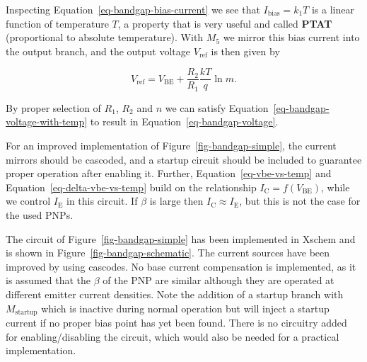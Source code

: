 \documentclass[
  a4paper,
  DIV=11,
  numbers=noendperiod]{scrartcl}
\begin{document}
Inspecting Equation~\ref{eq-bandgap-bias-current} we see that
\(I_\mathrm{bias} = k_1 T\) is a linear function of temperature \(T\), a
property that is very useful and called \textbf{PTAT} (proportional to
absolute temperature). With \(M_5\) we mirror this bias current into the
output branch, and the output voltage \(V_\mathrm{ref}\) is then given
by

\[
V_\mathrm{ref} = V_\mathrm{BE}+ \frac{R_2}{R_1} \frac{k T}{q} \ln m.  
\]

By proper selection of \(R_1\), \(R_2\) and \(n\) we can satisfy
Equation~\ref{eq-bandgap-voltage-with-temp} to result in
Equation~\ref{eq-bandgap-voltage}.

\begin{tcolorbox}[enhanced jigsaw, opacityback=0, title=\textcolor{quarto-callout-note-color}{\faInfo}\hspace{0.5em}{Improved Bandgap Reference}, leftrule=.75mm, bottomtitle=1mm, breakable, bottomrule=.15mm, opacitybacktitle=0.6, colbacktitle=quarto-callout-note-color!10!white, colframe=quarto-callout-note-color-frame, toptitle=1mm, titlerule=0mm, colback=white, rightrule=.15mm, coltitle=black, toprule=.15mm, left=2mm, arc=.35mm]

For an improved implementation of Figure~\ref{fig-bandgap-simple}, the
current mirrors should be cascoded, and a startup circuit should be
included to guarantee proper operation after enabling it. Further,
Equation~\ref{eq-vbe-vs-temp} and Equation~\ref{eq-delta-vbe-vs-temp}
build on the relationship \(I_\mathrm{C} = f(V_\mathrm{BE})\), while we
control \(I_\mathrm{E}\) in this circuit. If \(\beta\) is large then
\(I_\mathrm{C} \approx I_\mathrm{E}\), but this is not the case for the
used PNPs.

\end{tcolorbox}

The circuit of Figure~\ref{fig-bandgap-simple} has been implemented in
Xschem and is shown in Figure~\ref{fig-bandgap-schematic}. The current
sources have been improved by using cascodes. No base current
compensation is implemented, as it is assumed that the \(\beta\) of the
PNP are similar although they are operated at different emitter current
densities. Note the addition of a startup branch with
\(M_\mathrm{startup}\) which is inactive during normal operation but
will inject a startup current if no proper bias point has yet been
found. There is no circuitry added for enabling/disabling the circuit,
which would also be needed for a practical implementation.
\end{document}

